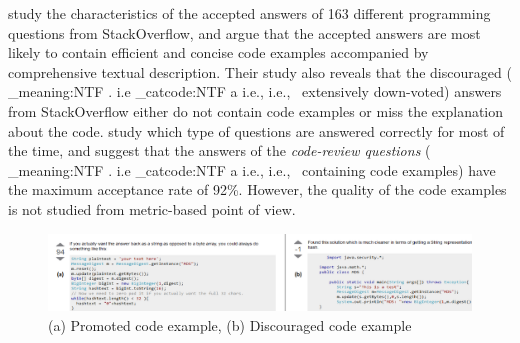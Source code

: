 \documentclass{sig-alternate}
\makeatletter
\newcommand\latinabbrev[1]{
  \peek_meaning:NTF . {%
    #1\@}%
  { \peek_catcode:NTF a {%
      #1., \@ }%
    {#1., \@}}}
\def\ie{\latinabbrev{i.e}}
\makeatother
\begin{document}
\citet{nasehi} study the characteristics of the accepted answers of 163 different programming questions from StackOverflow, and argue that  the accepted answers are most likely to contain efficient and concise code examples accompanied by comprehensive textual description. Their study also reveals that the discouraged (\ie\ extensively down-voted) answers from StackOverflow either do not contain code examples or miss the explanation about the code. \citet{nier} study which type of questions are answered correctly for most of the time, and suggest that the answers of the \emph{code-review questions} (\ie\ containing code examples) have the maximum acceptance rate of 92\%. However, the quality of the code examples is not studied from metric-based point of view.

\begin{figure}[!t]
\centering
\includegraphics[width=7in ]{whole23}
\caption{(a) Promoted code example, (b) Discouraged code example}
\vspace{-.2cm}
\label{fig:example}
\end{figure}

%
\end{document}
